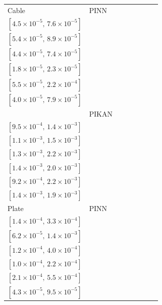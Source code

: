 \begin{tabular}{llcccccc}
Cable & PINN & \makecell{$5.8{\times}10^{-5}$\\{\scriptsize$[4.5{\times}10^{-5},\,7.6{\times}10^{-5}]$}} & \makecell{$6.9{\times}10^{-5}$\\{\scriptsize$[5.4{\times}10^{-5},\,8.9{\times}10^{-5}]$}} & \makecell{$5.7{\times}10^{-5}$\\{\scriptsize$[4.4{\times}10^{-5},\,7.4{\times}10^{-5}]$}} & \makecell{$\mathbf{2.0{\times}10^{-5}}$\\{\scriptsize$[1.8{\times}10^{-5},\,2.3{\times}10^{-5}]$}} & \makecell{$1.1{\times}10^{-4}$\\{\scriptsize$[5.5{\times}10^{-5},\,2.2{\times}10^{-4}]$}} & \makecell{$5.6{\times}10^{-5}$\\{\scriptsize$[4.0{\times}10^{-5},\,7.9{\times}10^{-5}]$}}\\
 & PIKAN & \makecell{$\mathbf{1.2{\times}10^{-3}}$\\{\scriptsize$[9.5{\times}10^{-4},\,1.4{\times}10^{-3}]$}} & \makecell{$1.3{\times}10^{-3}$\\{\scriptsize$[1.1{\times}10^{-3},\,1.5{\times}10^{-3}]$}} & \makecell{$1.7{\times}10^{-3}$\\{\scriptsize$[1.3{\times}10^{-3},\,2.2{\times}10^{-3}]$}} & \makecell{$1.7{\times}10^{-3}$\\{\scriptsize$[1.4{\times}10^{-3},\,2.0{\times}10^{-3}]$}} & \makecell{$1.4{\times}10^{-3}$\\{\scriptsize$[9.2{\times}10^{-4},\,2.2{\times}10^{-3}]$}} & \makecell{$1.6{\times}10^{-3}$\\{\scriptsize$[1.4{\times}10^{-3},\,1.9{\times}10^{-3}]$}}\\
\addlinespace
Plate & PINN & \makecell{$2.1{\times}10^{-4}$\\{\scriptsize$[1.4{\times}10^{-4},\,3.3{\times}10^{-4}]$}} & \makecell{$3.0{\times}10^{-4}$\\{\scriptsize$[6.2{\times}10^{-5},\,1.4{\times}10^{-3}]$}} & \makecell{$2.2{\times}10^{-4}$\\{\scriptsize$[1.2{\times}10^{-4},\,4.0{\times}10^{-4}]$}} & \makecell{$1.5{\times}10^{-4}$\\{\scriptsize$[1.0{\times}10^{-4},\,2.2{\times}10^{-4}]$}} & \makecell{$3.4{\times}10^{-4}$\\{\scriptsize$[2.1{\times}10^{-4},\,5.5{\times}10^{-4}]$}} & \makecell{$\mathbf{6.4{\times}10^{-5}}$\\{\scriptsize$[4.3{\times}10^{-5},\,9.5{\times}10^{-5}]$}}\\

\end{tabular}
